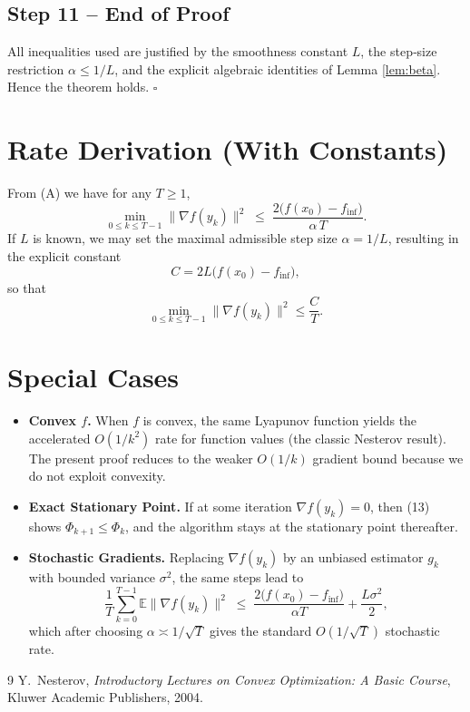 \documentclass{article}
\newcommand{\E}{\mathbb{E}}
\begin{document}
\subsection*{Step 11 – End of Proof}
All inequalities used are justified by the smoothness constant $L$, the step‑size restriction $\alpha\le 1/L$, and the explicit algebraic identities of Lemma \ref{lem:beta}.  Hence the theorem holds. \hfill $\square$

\section*{Rate Derivation (With Constants)}
From (A) we have for any $T\ge1$,
\[
\min_{0\le k\le T-1}\|\nabla f(y_k)\|^{2}
\;\le\;
\frac{2\bigl(f(x_0)-f_{\inf}\bigr)}{\alpha\,T}.
\]
If $L$ is known, we may set the maximal admissible step size $\alpha=1/L$, resulting in the explicit constant
\[
C = 2L\bigl(f(x_0)-f_{\inf}\bigr),
\]
so that
\[
\min_{0\le k\le T-1}\|\nabla f(y_k)\|^{2}\le \frac{C}{T}.
\]

\section*{Special Cases}
\begin{itemize}[leftmargin=*]
\item \textbf{Convex $f$.}  When $f$ is convex, the same Lyapunov function yields the accelerated $O(1/k^{2})$ rate for function values (the classic Nesterov result).  The present proof reduces to the weaker $O(1/k)$ gradient bound because we do not exploit convexity.
\item \textbf{Exact Stationary Point.}  If at some iteration $\nabla f(y_k)=0$, then (13) shows $\Phi_{k+1}\le\Phi_k$, and the algorithm stays at the stationary point thereafter.
\item \textbf{Stochastic Gradients.}  Replacing $\nabla f(y_k)$ by an unbiased estimator $g_k$ with bounded variance $\sigma^{2}$, the same steps lead to
\[
\frac{1}{T}\sum_{k=0}^{T-1}\E\|\nabla f(y_k)\|^{2}
\;\le\;
\frac{2\bigl(f(x_0)-f_{\inf}\bigr)}{\alpha T}
+\frac{L\sigma^{2}}{2},
\]
which after choosing $\alpha\asymp 1/\sqrt{T}$ gives the standard $O(1/\sqrt{T})$ stochastic rate.
\end{itemize}

\begin{thebibliography}{9}
Y.~Nesterov, \emph{Introductory Lectures on Convex Optimization: A Basic Course}, Kluwer Academic Publishers, 2004.
\end{thebibliography}
\end{document}
